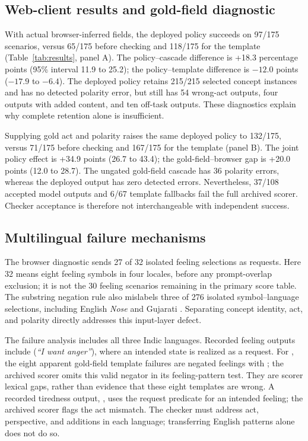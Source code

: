

\subsection{Web-client results and gold-field diagnostic}
With actual browser-inferred fields, the deployed policy succeeds on 97/175 scenarios, versus 65/175 before checking and 118/175 for the template (Table~\ref{tab:results}, panel A).
The policy--cascade difference is +18.3 percentage points (95\% interval 11.9 to 25.2); the policy--template difference is $-12.0$ points ($-17.9$ to $-6.4$).
The deployed policy retains 215/215 selected concept instances and has no detected polarity error, but still has 54 wrong-act outputs, four outputs with added content, and ten off-task outputs.
These diagnostics explain why complete retention alone is insufficient.

Supplying gold act and polarity raises the same deployed policy to 132/175, versus 71/175 before checking and 167/175 for the template (panel B).
The joint policy effect is +34.9 points (26.7 to 43.4); the gold-field--browser gap is +20.0 points (12.0 to 28.7).
The ungated gold-field cascade has 36 polarity errors, whereas the deployed output has zero detected errors.
Nevertheless, 37/108 accepted model outputs and 6/67 template fallbacks fail the full archived scorer.
Checker acceptance is therefore not interchangeable with independent success.

\subsection{Multilingual failure mechanisms}
The browser diagnostic sends 27 of 32 isolated feeling selections as requests.
Here 32 means eight feeling symbols in four locales, before any prompt-overlap exclusion; it is not the 30 feeling scenarios remaining in the primary score table.
The substring negation rule also mislabels three of 276 isolated symbol--language selections, including English \emph{Nose} and Gujarati .
Separating concept identity, act, and polarity directly addresses this input-layer defect.

The failure analysis includes all three Indic languages.
Recorded  feeling outputs include  (\emph{“I want anger”}), where an intended state is realized as a request.
For , the eight apparent gold-field template failures are negated feelings with ; the archived scorer omits this valid negator in its feeling-pattern test.
They are scorer lexical gaps, rather than evidence that these eight templates are wrong.
A recorded  tiredness output, , uses the request predicate  for an intended feeling; the archived scorer flags the act mismatch.
The checker must address act, perspective, and additions in each language; transferring English patterns alone does not do so.

